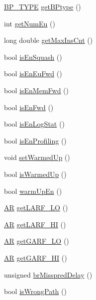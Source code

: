 \begin{DoxyCompactItemize}
\hyperlink{global_2global_8h_a66f26a0131462195055f25dc2fe952f8}{BP\_\-TYPE} \hyperlink{classconfig_a590b78c2b19952195de93fb8ccda10cc}{getBPtype} ()
\item 
int \hyperlink{classconfig_a251d502d37db7bd0ea6c268c55fb8956}{getNumEu} ()
\item 
long double \hyperlink{classconfig_a837d986a2972eaeae9c0b46c2566ecec}{getMaxInsCnt} ()
\item 
bool \hyperlink{classconfig_a92554ae5ad4d8db473c1894f2bd119fc}{isEnSquash} ()
\item 
bool \hyperlink{classconfig_ae927f81be9eec26997ccca2601c6cfc7}{isEnEuFwd} ()
\item 
bool \hyperlink{classconfig_a12202da8711bd354d5b1a98693c0efa8}{isEnMemFwd} ()
\item 
bool \hyperlink{classconfig_a36705d014a0017f1dcf0fdb11838a31b}{isEnFwd} ()
\item 
bool \hyperlink{classconfig_a7a0aeef57c716fc8c8b72cb31bfabcff}{isEnLogStat} ()
\item 
bool \hyperlink{classconfig_a14a41780de0d5bc586fd79a202eca047}{isEnProfiling} ()
\item 
void \hyperlink{classconfig_a359ca41b9b50c84a73c826bc896588b8}{setWarmedUp} ()
\item 
bool \hyperlink{classconfig_abe24c6843643f18ae5897b868f76e0e5}{isWarmedUp} ()
\item 
bool \hyperlink{classconfig_a25bf7a9e673f260e38e65633a0b3c0e9}{warmUpEn} ()
\item 
\hyperlink{global_2global_8h_a735ca3cb7fa17e60af6701a846722516}{AR} \hyperlink{classconfig_ad4a483605bc08660247399a42137a2d2}{getLARF\_\-LO} ()
\item 
\hyperlink{global_2global_8h_a735ca3cb7fa17e60af6701a846722516}{AR} \hyperlink{classconfig_aff59ff4ebcf158004d507e5eda2ebb47}{getLARF\_\-HI} ()
\item 
\hyperlink{global_2global_8h_a735ca3cb7fa17e60af6701a846722516}{AR} \hyperlink{classconfig_ae53e27cfc1f32047f93dc51aab146c36}{getGARF\_\-LO} ()
\item 
\hyperlink{global_2global_8h_a735ca3cb7fa17e60af6701a846722516}{AR} \hyperlink{classconfig_a7771dd7ff24081e6035f2ddd77872417}{getGARF\_\-HI} ()
\item 
unsigned \hyperlink{classconfig_acfdbc61d57ab979c3bc2e3a45d3f88ad}{brMisspredDelay} ()
\item 
bool \hyperlink{classconfig_a0580212c629d1811cfeaf6d035518843}{isWrongPath} ()
\end{DoxyCompactItemize}
